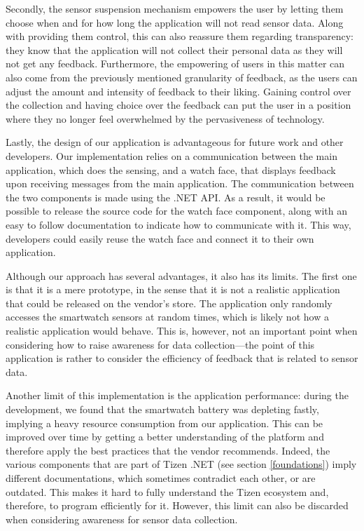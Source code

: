 \documentclass[conference, a4paper, 10pt, twocolumn]{IEEEtran}
\begin{document}
Secondly, the sensor suspension mechanism empowers the user by letting them choose when and for how long the application will not read sensor data. Along with providing them control, this can also reassure them regarding transparency: they know that the application will not collect their personal data as they will not get any feedback. Furthermore, the empowering of users in this matter can also come from the previously mentioned granularity of feedback, as the users can adjust the amount and intensity of feedback to their liking. Gaining control over the collection and having choice over the feedback can put the user in a position where they no longer feel overwhelmed by the pervasiveness of technology.


Lastly, the design of our application is advantageous for future work and other developers. Our implementation relies on a communication between the main application, which does the sensing, and a watch face, that displays feedback upon receiving messages from the main application. The communication between the two components is made using the .NET \ac{API}. As a result, it would be possible to release the source code for the watch face component, along with an easy to follow documentation to indicate how to communicate with it. This way, developers could easily reuse the watch face and connect it to their own application.

Although our approach has several advantages, it also has its limits. The first one is that it is a mere prototype, in the sense that it is not a realistic application that could be released on the vendor's store. The application only randomly accesses the smartwatch sensors at random times, which is likely not how a realistic application would behave. This is, however, not an important point when considering how to raise awareness for data collection---the point of this application is rather to consider the efficiency of feedback that is related to sensor data.  

Another limit of this implementation is the application performance: during the development, we found that the smartwatch battery was depleting fastly, implying a heavy resource consumption from our application. This can be improved over time by getting a better understanding of the platform and therefore apply the best practices that the vendor recommends. Indeed, the various components that are part of Tizen .NET (see section \ref{foundations}) imply different documentations, which sometimes contradict each other, or are outdated. This makes it hard to fully understand the Tizen ecosystem and, therefore, to program efficiently for it. However, this limit can also be discarded when considering awareness for sensor data collection.
\end{document}
